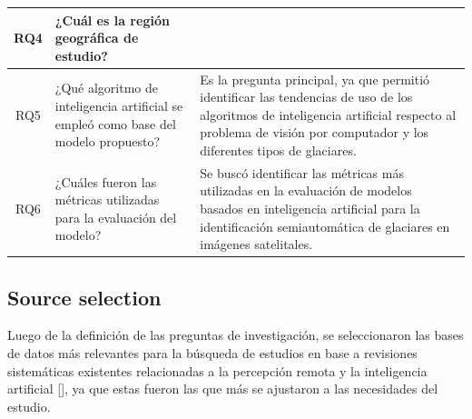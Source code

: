 \documentclass{article}
\begin{document}
\begin{table}[H]
\begin{tabularx}{\textwidth}{cXX}
        RQ4          & ¿Cuál es la región geográfica de estudio?                                                      &                                                                                                                                                                                                                   \\ \hline
        RQ5          & ¿Qué algoritmo de inteligencia artificial se empleó como base del modelo propuesto?            & Es la pregunta principal, ya que permitió identificar las tendencias de uso de los algoritmos de inteligencia artificial respecto al problema de visión por computador y los diferentes tipos de glaciares.       \\ \hline
        RQ6          & ¿Cuáles fueron las métricas utilizadas para la evaluación del modelo?                          & Se buscó identificar las métricas más utilizadas en la evaluación de modelos basados en inteligencia artificial para la identificación semiautomática de glaciares en imágenes satelitales.                       \\ \hline
    \end{tabularx}
\end{table}

\subsection{Source selection}

Luego de la definición de las preguntas de investigación, se seleccionaron las bases de datos más relevantes para la búsqueda de estudios en base a revisiones sistemáticas existentes relacionadas a la percepción remota y la inteligencia artificial [], ya que estas fueron las que más se ajustaron a las necesidades del estudio.
\end{document}
